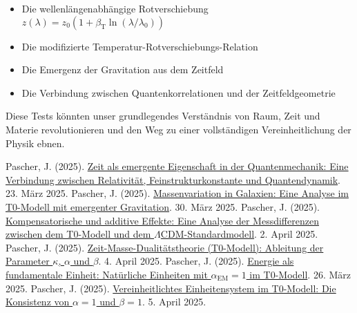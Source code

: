 \documentclass[12pt,a4paper]{article}
\newcommand{\betaT}{\beta_{\text{T}}}
\newcommand{\alphaEM}{\alpha_{\text{EM}}}
\begin{document}
	\begin{itemize}
		\item Die wellenlängenabhängige Rotverschiebung \(z(\lambda) = z_0 (1 + \betaT \ln(\lambda/\lambda_0))\)
		\item Die modifizierte Temperatur-Rotverschiebungs-Relation
		\item Die Emergenz der Gravitation aus dem Zeitfeld
		\item Die Verbindung zwischen Quantenkorrelationen und der Zeitfeldgeometrie
	\end{itemize}
	
	Diese Tests könnten unser grundlegendes Verständnis von Raum, Zeit und Materie revolutionieren und den Weg zu einer vollständigen Vereinheitlichung der Physik ebnen.
	
	\begin{thebibliography}{99}
		 Pascher, J. (2025). \href{https://github.com/jpascher/T0-Time-Mass-Duality/tree/main/2/pdf/Deutsch/Zeit\%20als\%20emergente\%20Eigenschaft\%20in\%20der\%20Quantenmechanik.pdf}{Zeit als emergente Eigenschaft in der Quantenmechanik: Eine Verbindung zwischen Relativität, Feinstrukturkonstante und Quantendynamik}. 23. März 2025.
		 Pascher, J. (2025). \href{https://github.com/jpascher/T0-Time-Mass-Duality/tree/main/2/pdf/Deutsch/Massenvariation\%20in\%20Galaxien.pdf}{Massenvariation in Galaxien: Eine Analyse im T0-Modell mit emergenter Gravitation}. 30. März 2025.
		 Pascher, J. (2025). \href{https://github.com/jpascher/T0-Time-Mass-Duality/tree/main/2/pdf/Deutsch/Analyse\%20der\%20Messdifferenzen\%20zwischen\%20dem\%20T0-Modell\%20und\%20dem\%20Standardmodell.pdf}{Kompensatorische und additive Effekte: Eine Analyse der Messdifferenzen zwischen dem T0-Modell und dem \(\Lambda\)CDM-Standardmodell}. 2. April 2025.
		 Pascher, J. (2025). \href{https://github.com/jpascher/T0-Time-Mass-Duality/tree/main/2/pdf/Deutsch/Zeit-Masse-Dualitätstheorie\%20(T0-Modell)\%20Herleitung\%20der\%20Parameter\%20kappa,\%20alpha\%20und\%20beta.pdf}{Zeit-Masse-Dualitätstheorie (T0-Modell): Ableitung der Parameter \(\kappa\), \(\alpha\) und \(\beta\)}. 4. April 2025.
		 Pascher, J. (2025). \href{https://github.com/jpascher/T0-Time-Mass-Duality/tree/main/2/pdf/Deutsch/Natürliche\%20Einheiten\%20mit\%20Feinstrukturkonstante\%20alpha\%20=\%201.pdf}{Energie als fundamentale Einheit: Natürliche Einheiten mit \(\alphaEM = 1\) im T0-Modell}. 26. März 2025.
		 Pascher, J. (2025). \href{https://github.com/jpascher/T0-Time-Mass-Duality/tree/main/2/pdf/Deutsch/Die\%20Konsistenz\%20von\%20alpha\%20=\%201\%20und\%20beta\%20=\%201.pdf}{Vereinheitlichtes Einheitensystem im T0-Modell: Die Konsistenz von \(\alpha = 1\) und \(\beta = 1\)}. 5. April 2025.

\end{thebibliography}
\end{document}
